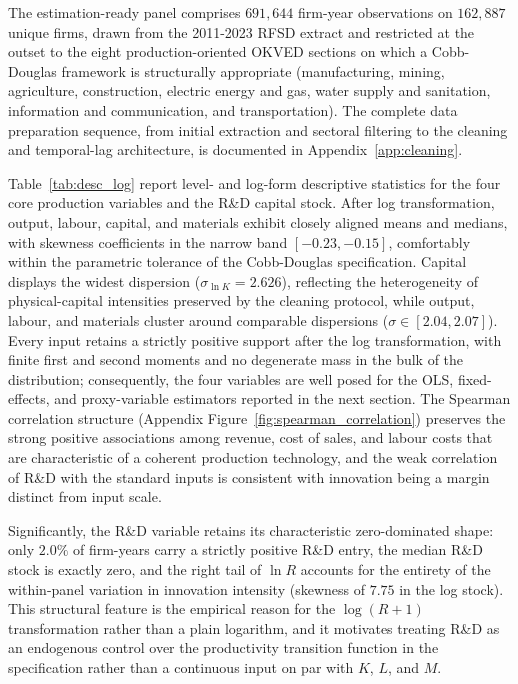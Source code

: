 \documentclass[a4paper, 12pt]{article}
\begin{document}
The estimation-ready panel comprises $691{,}644$ firm-year observations on $162{,}887$ unique firms, drawn from the 2011-2023 RFSD extract and restricted at the outset to the eight production-oriented OKVED sections on which a Cobb-Douglas framework is structurally appropriate (manufacturing, mining, agriculture, construction, electric energy and gas, water supply and sanitation, information and communication, and transportation). The complete data preparation sequence, from initial extraction and sectoral filtering to the cleaning and temporal-lag architecture, is documented in Appendix~\ref{app:cleaning}. 

Table~\ref{tab:desc_log} report level- and log-form descriptive statistics for the four core production variables and the R\&D capital stock. After log transformation, output, labour, capital, and materials exhibit closely aligned means and medians, with skewness coefficients in the narrow band $[-0.23,-0.15]$, comfortably within the parametric tolerance of the Cobb-Douglas specification. Capital displays the widest dispersion ($\sigma_{\ln K} = 2.626$), reflecting the heterogeneity of physical-capital intensities preserved by the cleaning protocol, while output, labour, and materials cluster around comparable dispersions ($\sigma \in [2.04, 2.07]$). Every input retains a strictly positive support after the log transformation, with finite first and second moments and no degenerate mass in the bulk of the distribution; consequently, the four variables are well posed for the OLS, fixed-effects, and proxy-variable estimators reported in the next section. The Spearman correlation structure (Appendix Figure~\ref{fig:spearman_correlation}) preserves the strong positive associations among revenue, cost of sales, and labour costs that are characteristic of a coherent production technology, and the weak correlation of R\&D with the standard inputs is consistent with innovation being a margin distinct from input scale.

Significantly, the R\&D variable retains its characteristic zero-dominated shape: only $2.0\%$ of firm-years carry a strictly positive R\&D entry, the median R\&D stock is exactly zero, and the right tail of $\ln R$ accounts for the entirety of the within-panel variation in innovation intensity (skewness of $7.75$ in the log stock). This structural feature is the empirical reason for the $\log(R+1)$ transformation rather than a plain logarithm, and it motivates treating R\&D as an endogenous control over the productivity transition function in the \textcite{doraszelski2013r} specification rather than a continuous input on par with $K$, $L$, and $M$.
\end{document}
